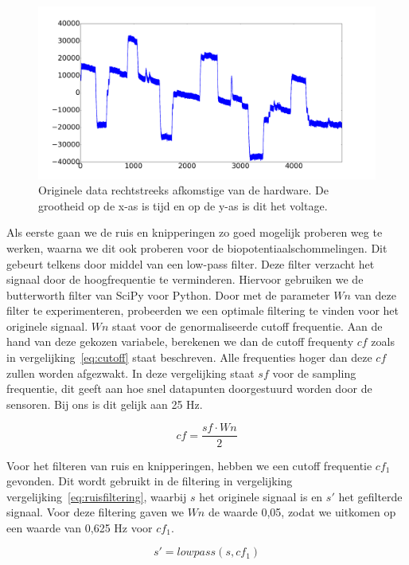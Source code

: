 \documentclass{article}
\begin{document}
\begin{figure}[h]
\centering
\includegraphics[width=\linewidth]{images/original_data}
\caption{Originele data rechtstreeks afkomstige van de hardware. De grootheid op de x-as is tijd en op de y-as is dit het voltage.}
\label{fig:originaldata}
\end{figure}

Als eerste gaan we de ruis en knipperingen zo goed mogelijk proberen weg te werken, waarna we dit ook proberen voor de biopotentiaalschommelingen. Dit gebeurt telkens door middel van een low-pass filter. Deze filter verzacht het signaal door de hoogfrequentie te verminderen. Hiervoor gebruiken we de butterworth filter van SciPy voor Python. Door met de parameter $Wn$ van deze filter te experimenteren, probeerden we een optimale filtering te vinden voor het originele signaal. $Wn$ staat voor de genormaliseerde cutoff frequentie. Aan de hand van deze gekozen variabele, berekenen we dan de cutoff frequenty $cf$ zoals in vergelijking~\ref{eq:cutoff} staat beschreven. Alle frequenties hoger dan deze $cf$ zullen worden afgezwakt. In deze vergelijking staat $sf$ voor de sampling frequentie, dit geeft aan hoe snel datapunten doorgestuurd worden door de sensoren. Bij ons is dit gelijk aan 25 Hz.

\begin{equation}
\label{eq:cutoff}
cf = \frac{sf \cdot Wn}{2}
\end{equation}

Voor het filteren van ruis en knipperingen, hebben we een cutoff frequentie $cf_1$ gevonden. Dit wordt gebruikt in de filtering in vergelijking vergelijking~\ref{eq:ruisfiltering}, waarbij $s$ het originele signaal is en $s'$ het gefilterde signaal. Voor deze filtering gaven we $Wn$ de waarde 0,05, zodat we uitkomen op een waarde van 0,625 Hz voor $cf_1$.

\begin{equation}
\label{eq:ruisfiltering}
s' = lowpass(s, cf_1)
\end{equation}
\end{document}
